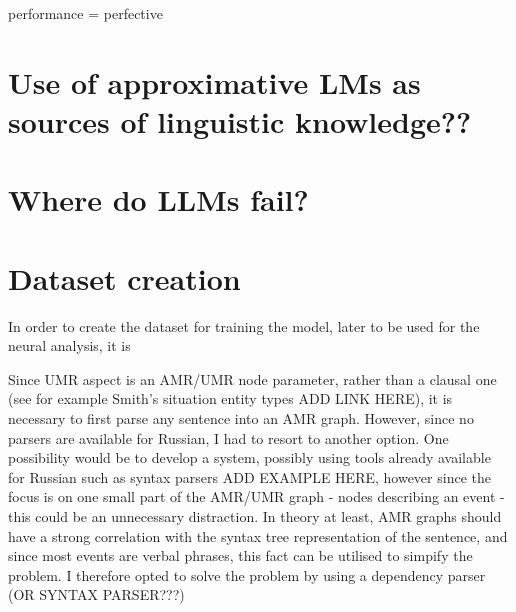 performance = perfective

\section{Use of approximative LMs as sources of linguistic knowledge??}
\section{Where do LLMs fail?}

\section*{Dataset creation}
In order to create the dataset for training the model, later to be used for the neural analysis, it is 

Since UMR aspect is an AMR/UMR node parameter, rather than a clausal one (see for example Smith's situation entity types ADD LINK HERE), it is necessary to first parse any sentence into an AMR graph. However, since no parsers are available for Russian, I had to resort to another option. One possibility would be to develop a system, possibly using tools already available for Russian such as syntax parsers ADD EXAMPLE HERE, however since the focus is on one small part of the AMR/UMR graph - nodes describing an event - this could be an unnecessary distraction. In theory at least, AMR graphs should have a strong correlation with the syntax tree representation of the sentence, and since most events are verbal phrases, this fact can be utilised to simpify the problem. I therefore opted to solve the problem by using a dependency parser (OR SYNTAX PARSER???)